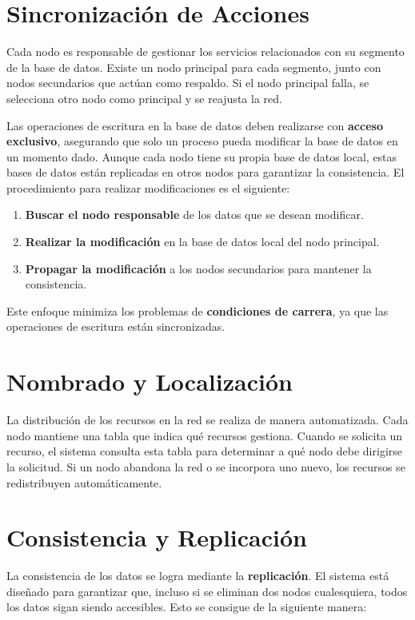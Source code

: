 \documentclass{article}
\begin{document}
\section{Sincronización de Acciones}

Cada nodo es responsable de gestionar los servicios relacionados con su segmento de la base de datos. Existe un nodo principal para cada segmento, junto con nodos secundarios que actúan como respaldo. Si el nodo principal falla, se selecciona otro nodo como principal y se reajusta la red.

Las operaciones de escritura en la base de datos deben realizarse con \textbf{acceso exclusivo}, asegurando que solo un proceso pueda modificar la base de datos en un momento dado. Aunque cada nodo tiene su propia base de datos local, estas bases de datos están replicadas en otros nodos para garantizar la consistencia. El procedimiento para realizar modificaciones es el siguiente:

\begin{enumerate}
    \item \textbf{Buscar el nodo responsable} de los datos que se desean modificar.
    \item \textbf{Realizar la modificación} en la base de datos local del nodo principal.
    \item \textbf{Propagar la modificación} a los nodos secundarios para mantener la consistencia.
\end{enumerate}

Este enfoque minimiza los problemas de \textbf{condiciones de carrera}, ya que las operaciones de escritura están sincronizadas.

\section{Nombrado y Localización}

La distribución de los recursos en la red se realiza de manera automatizada. Cada nodo mantiene una tabla que indica qué recursos gestiona. Cuando se solicita un recurso, el sistema consulta esta tabla para determinar a qué nodo debe dirigirse la solicitud. Si un nodo abandona la red o se incorpora uno nuevo, los recursos se redistribuyen automáticamente.

\section{Consistencia y Replicación}

La consistencia de los datos se logra mediante la \textbf{replicación}. El sistema está diseñado para garantizar que, incluso si se eliminan dos nodos cualesquiera, todos los datos sigan siendo accesibles. Esto se consigue de la siguiente manera:
\end{document}
